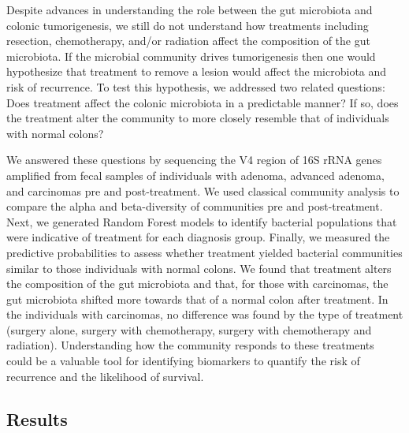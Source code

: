 \documentclass[12pt,]{article}
\begin{document}
Despite advances in understanding the role between the gut microbiota
and colonic tumorigenesis, we still do not understand how treatments
including resection, chemotherapy, and/or radiation affect the
composition of the gut microbiota. If the microbial community drives
tumorigenesis then one would hypothesize that treatment to remove a
lesion would affect the microbiota and risk of recurrence. To test this
hypothesis, we addressed two related questions: Does treatment affect
the colonic microbiota in a predictable manner? If so, does the
treatment alter the community to more closely resemble that of
individuals with normal colons?

We answered these questions by sequencing the V4 region of 16S rRNA
genes amplified from fecal samples of individuals with adenoma, advanced
adenoma, and carcinomas pre and post-treatment. We used classical
community analysis to compare the alpha and beta-diversity of
communities pre and post-treatment. Next, we generated Random Forest
models to identify bacterial populations that were indicative of
treatment for each diagnosis group. Finally, we measured the predictive
probabilities to assess whether treatment yielded bacterial communities
similar to those individuals with normal colons. We found that treatment
alters the composition of the gut microbiota and that, for those with
carcinomas, the gut microbiota shifted more towards that of a normal
colon after treatment. In the individuals with carcinomas, no difference
was found by the type of treatment (surgery alone, surgery with
chemotherapy, surgery with chemotherapy and radiation). Understanding
how the community responds to these treatments could be a valuable tool
for identifying biomarkers to quantify the risk of recurrence and the
likelihood of survival.

\newpage

\subsection{Results}\label{results}
\end{document}
